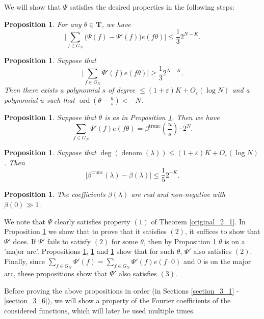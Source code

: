 \documentclass[11pt, reqno]{amsart}
\newtheorem{proposition}[theorem]{Proposition}
\numberwithin{equation}{section}
\newcommand{\betatrunc}{\beta^{\trunc}}
\newcommand\eps{\varepsilon}
\newcommand\ord{\operatorname{ord}}
\newcommand\denom{\operatorname{denom}}
\newcommand\trunc{\operatorname{trunc}}
\begin{document}
We will show that $\Psi$ satisfies the desired properties in the following steps:

\begin{proposition}
\label{original_3_1}
    For any $\theta \in \mathbf{T}$, we have $$\bigg| \sum_{f \in G_N} \big( \Psi(f) - \Psi'(f) \big) e(f\theta) \bigg| \leqslant \frac{1}{3}2^{N-K}.$$
\end{proposition}

\begin{proposition}
\label{original_3_2}
    Suppose that $$\bigg| \sum_{f \in G_N} \Psi'(f) e(f\theta) \bigg| \geqslant \frac{1}{3}2^{N-K}.$$
    Then there exists a polynomial $s$ of degree $\leqslant (1+\eps)K+O_{\eps}(\log N)$ and a polynomial $u$ such that $\ord(\theta - \frac{u}{s}) < -N$.
\end{proposition}

\begin{proposition}
\label{original_3_3}
    Suppose that $\theta$ is as in Proposition \ref{original_3_2}. Then we have
    $$\sum_{f \in G_N} \Psi'(f) e(f\theta) = \beta^{\trunc}(\frac{u}{s})\cdot 2^N.$$
\end{proposition}

\begin{proposition}
\label{original_3_4}
    Suppose that $\deg (\denom(\lambda)) \leqslant (1+\eps)K+O_{\eps}(\log N)$. Then $$\Big| \betatrunc(\lambda) - \beta(\lambda) \Big| \leqslant \frac{1}{5}2^{-K}.$$
\end{proposition}

\begin{proposition}
\label{original_3_6}
    The coefficients $\beta(\lambda)$ are real and non-negative with $\beta(0) \gg 1$.
\end{proposition}

We note that $\Psi$ clearly satisfies property $(1)$ of Theorem \ref{original_2_1}. In Proposition \ref{original_3_1} we show that to prove that it satisfies $(2)$, it suffices to show that $\Psi'$ does. If $\Psi'$ fails to satisfy $(2)$ for some $\theta$, then by Proposition \ref{original_3_2} $\theta$ is on a 'major arc'. Propositions \ref{original_3_3}, \ref{original_3_4} and \ref{original_3_6} show that for such $\theta$, $\Psi'$ also satisfies $(2)$. Finally, since $\sum_{f \in G_N} \Psi'(f)=\sum_{f \in G_N} \Psi'(f) e(f \cdot 0)$ and $0$ is on the major arc, these propositions show that $\Psi'$ also satisfies $(3)$.

Before proving the above propositions in order (in Sections \ref{section_3_1} - \ref{section_3_6}), we will show a property of the Fourier coefficients of the considered functions, which will later be used multiple times.
\end{document}
